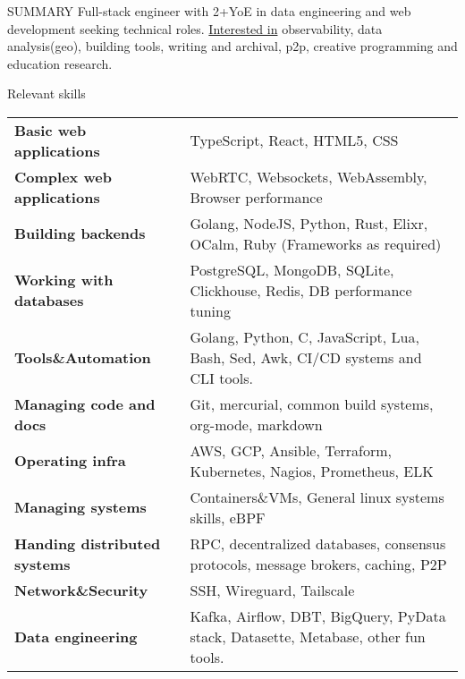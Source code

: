 \documentclass{resume} %
\begin{document}

\begin{rSection}{SUMMARY}
  {Full-stack engineer with 2+YoE in data engineering and web development seeking technical roles. \href{https://geekodour.org/docs/documents/collaborate/#strengths-and-specialties}{Interested in} observability, data analysis(geo), building tools, writing and archival, p2p, creative programming and education research.}
\end{rSection}

\begin{rSection}{Relevant skills}
  \begin{tabular}{ @{} >{\bfseries}l @{\hspace{6ex}} l }
    Basic web applications & TypeScript, React, HTML5, CSS\\
    Complex web applications & WebRTC, Websockets, WebAssembly, Browser performance\\
    Building backends & Golang, NodeJS, Python, Rust, Elixr, OCalm, Ruby (Frameworks as required)\\
    Working with databases & PostgreSQL, MongoDB, SQLite, Clickhouse, Redis, DB performance tuning\\
    Tools\&Automation & Golang, Python, C, JavaScript, Lua, Bash, Sed, Awk, CI/CD systems and CLI tools.\\
    Managing code and docs & Git, mercurial, common build systems, org-mode, markdown\\
    Operating infra & AWS, GCP, Ansible, Terraform, Kubernetes, Nagios, Prometheus, ELK\\
    Managing systems & Containers\&VMs, General linux systems skills, eBPF\\
    Handing distributed systems & RPC, decentralized databases, consensus protocols, message brokers, caching, P2P\\
    Network\&Security & SSH, Wireguard, Tailscale\\
    Data engineering & Kafka, Airflow, DBT, BigQuery, PyData stack, Datasette, Metabase, other fun tools.\\
  \end{tabular}\
\end{rSection}
\end{document}
